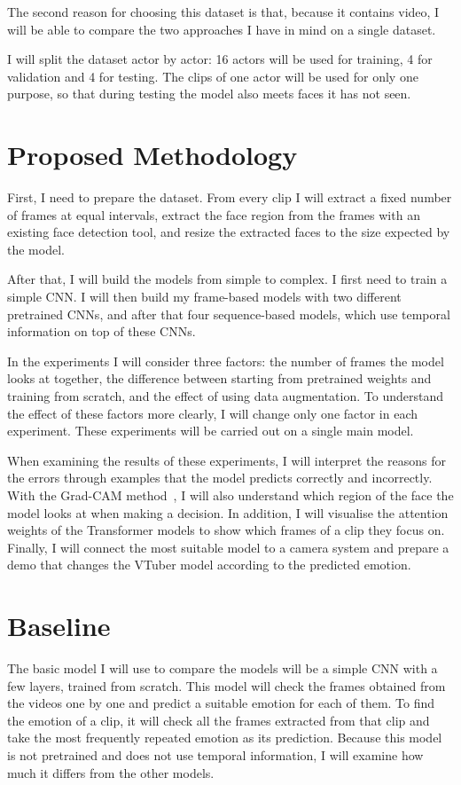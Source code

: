 \documentclass[10pt,a4paper,twocolumn]{article}
\begin{document}
The second reason for choosing this dataset is that, because it contains video, I will be able to compare the two approaches I have in mind on a single dataset.

I will split the dataset actor by actor: 16 actors will be used for training, 4 for validation and 4 for testing. The clips of one actor will be used for only one purpose, so that during testing the model also meets faces it has not seen.

\section{Proposed Methodology}
First, I need to prepare the dataset. From every clip I will extract a fixed number of frames at equal intervals, extract the face region from the frames with an existing face detection tool, and resize the extracted faces to the size expected by the model.

After that, I will build the models from simple to complex. I first need to train a simple CNN. I will then build my frame-based models with two different pretrained CNNs, and after that four sequence-based models, which use temporal information on top of these CNNs.

In the experiments I will consider three factors: the number of frames the model looks at together, the difference between starting from pretrained weights and training from scratch, and the effect of using data augmentation. To understand the effect of these factors more clearly, I will change only one factor in each experiment. These experiments will be carried out on a single main model.

When examining the results of these experiments, I will interpret the reasons for the errors through examples that the model predicts correctly and incorrectly. With the Grad-CAM method~\cite{gradcam}, I will also understand which region of the face the model looks at when making a decision. In addition, I will visualise the attention weights of the Transformer models to show which frames of a clip they focus on. Finally, I will connect the most suitable model to a camera system and prepare a demo that changes the VTuber model according to the predicted emotion.

\newpage %
\section{Baseline}
The basic model I will use to compare the models will be a simple CNN with a few layers, trained from scratch. This model will check the frames obtained from the videos one by one and predict a suitable emotion for each of them. To find the emotion of a clip, it will check all the frames extracted from that clip and take the most frequently repeated emotion as its prediction. Because this model is not pretrained and does not use temporal information, I will examine how much it differs from the other models.
\end{document}
